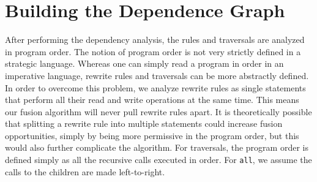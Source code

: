


\section{Building the Dependence Graph}
After performing the dependency analysis, the rules and traversals are analyzed in program order. The notion of program order is not very strictly defined in a strategic language. Whereas one can simply read a program in order in an imperative language, rewrite rules and traversals can be more abstractly defined. In order to overcome this problem, we analyze rewrite rules as single statements that perform all their read and write operations at the same time. This means our fusion algorithm will never pull rewrite rules apart. It is theoretically possible that splitting a rewrite rule into multiple statements could increase fusion opportunities, simply by being more permissive in the program order, but this would also further complicate the algorithm. For traversals, the program order is defined simply as all the recursive calls executed in order. For \texttt{all}, we assume the calls to the children are made left-to-right.


